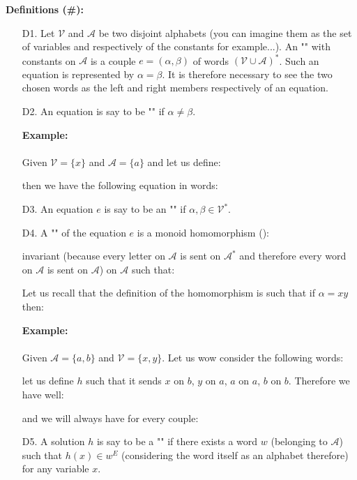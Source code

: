 	\textbf{Definitions (\#\mydef):}
	\begin{enumerate}
		\item[D1.] Let $\mathcal{V}$ and $\mathcal{A}$ be two disjoint alphabets (you can imagine them as the set of variables and respectively of the constants for example...). An "" with constants on $\mathcal{A}$ is a couple $e=(\alpha,\beta)$ of words $(\mathcal{V}\cup \mathcal{A})^{*}$. Such an equation is represented by $\alpha=\beta$. It is therefore necessary to see the two chosen words as the left and right members respectively of an equation.
		
		\item[D2.]  An equation is say to be "" if $\alpha\neq \beta$.
		
		\begin{tcolorbox}[colframe=black,colback=white,sharp corners]
		\textbf{{\Large {}}Example:}\\\\
		Given $\mathcal{V}=\{x\}$ and $\mathcal{A}=\{a\}$ and let us define:
		
		then we have the following equation in words:
		
		\end{tcolorbox}

		\item[D3.] An equation $e$ is say to be an "" if $\alpha,\beta\in\mathcal{V}^{*}$.

		\item[D4.] A "" of the equation $e$ is a monoid homomorphism ():
		
		invariant (because every letter on $\mathcal{A}$ is sent on $\mathcal{A}^{*}$ and therefore every word on $\mathcal{A}$ is sent on $\mathcal{A}$) on $\mathcal{A}$ such that:
		
		\begin{tcolorbox}[title=Remark,colframe=black,arc=10pt]
		Let us recall that the definition of the homomorphism is such that if $\alpha=xy$ then:
		
		\end{tcolorbox}
		\begin{tcolorbox}[colframe=black,colback=white,sharp corners]
		\textbf{{\Large {}}Example:}\\\\
		Given $\mathcal{A}=\{a,b\}$ and $\mathcal{V}=\{x,y\}$. Let us wow consider the following words:
		
		let us define $h$ such that it sends $x$ on $b$, $y$ on $a$, $a$ on $a$, $b$ on $b$. Therefore we have well:
		
		and we will always have for every couple:
		
		\end{tcolorbox}
		
		\item[D5.] A solution $h$ is say to be a "" if there exists a word $w$ (belonging to $\mathcal{A}$) such that $h(x)\in w^{E}$ (considering the word itself as an alphabet therefore) for any variable $x$.
	\end{enumerate}
	
